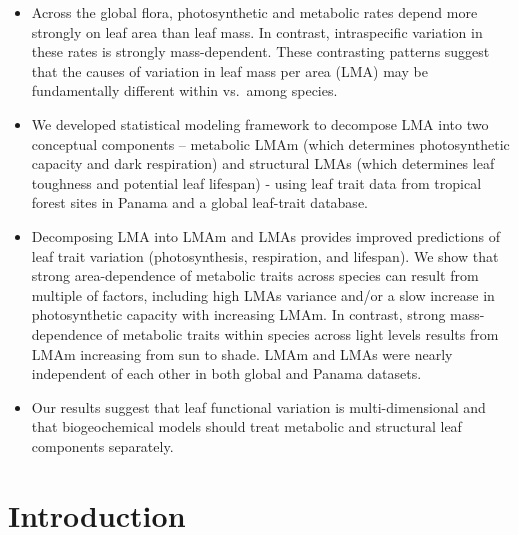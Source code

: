 \documentclass[
  12pt,
  letterpaper,
  DIV=11,
  numbers=noendperiod]{scrartcl}
\begin{document}
\begin{itemize}
\item
  Across the global flora, photosynthetic and metabolic rates depend
  more strongly on leaf area than leaf mass. In contrast, intraspecific
  variation in these rates is strongly mass-dependent. These contrasting
  patterns suggest that the causes of variation in leaf mass per area
  (LMA) may be fundamentally different within vs.~among species.
\item
  We developed statistical modeling framework to decompose LMA into two
  conceptual components -- metabolic LMAm (which determines
  photosynthetic capacity and dark respiration) and structural LMAs
  (which determines leaf toughness and potential leaf lifespan) - using
  leaf trait data from tropical forest sites in Panama and a global
  leaf-trait database.
\item
  Decomposing LMA into LMAm and LMAs provides improved predictions of
  leaf trait variation (photosynthesis, respiration, and lifespan). We
  show that strong area-dependence of metabolic traits across species
  can result from multiple of factors, including high LMAs variance
  and/or a slow increase in photosynthetic capacity with increasing
  LMAm. In contrast, strong mass-dependence of metabolic traits within
  species across light levels results from LMAm increasing from sun to
  shade. LMAm and LMAs were nearly independent of each other in both
  global and Panama datasets.
\item
  Our results suggest that leaf functional variation is
  multi-dimensional and that biogeochemical models should treat
  metabolic and structural leaf components separately.
\end{itemize}

\hypertarget{introduction}{%
\section{Introduction}\label{introduction}}
\end{document}
